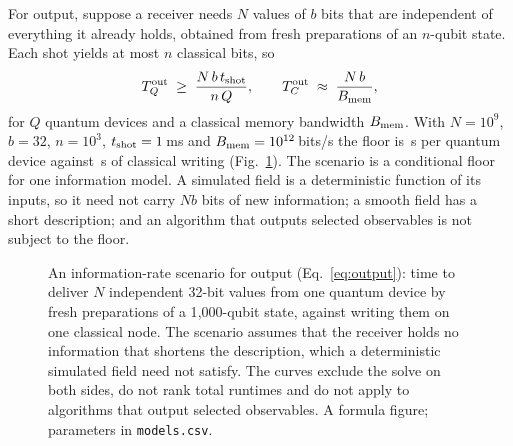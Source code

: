 \documentclass[10pt,a4paper]{article}
\begin{document}
For output, suppose a receiver needs $N$ values of $b$ bits that are independent of everything it already holds, obtained from fresh preparations of an $n$-qubit state. Each shot yields at most $n$ classical bits, so
\begin{equation}
T^{\rm out}_Q \;\ge\; \frac{N\,b\,t_{\rm shot}}{n\,Q},\qquad T^{\rm out}_C \;\approx\; \frac{N\,b}{B_{\rm mem}},
\label{eq:output}
\end{equation}
for $Q$ quantum devices and a classical memory bandwidth $B_{\rm mem}$. With $N=10^9$, $b=32$, $n=10^3$, $t_{\rm shot}=1$\,ms and $B_{\rm mem}=10^{12}$\,bits/s the floor is \outQ\,s per quantum device against \outC\,s of classical writing (Fig.~\ref{fig:readout}). The scenario is a conditional floor for one information model. A simulated field is a deterministic function of its inputs, so it need not carry $Nb$ bits of new information; a smooth field has a short description; and an algorithm that outputs selected observables is not subject to the floor.

\begin{figure}[htbp]
\centering
{}
\caption[Output time under an information-rate scenario]{An information-rate scenario for output (Eq.~\ref{eq:output}): time to deliver $N$ independent 32-bit values from one quantum device by fresh preparations of a 1{,}000-qubit state, against writing them on one classical node. The scenario assumes that the receiver holds no information that shortens the description, which a deterministic simulated field need not satisfy. The curves exclude the solve on both sides, do not rank total runtimes and do not apply to algorithms that output selected observables. A formula figure; parameters in \texttt{models.csv}.}
\label{fig:readout}
\end{figure}
\end{document}
